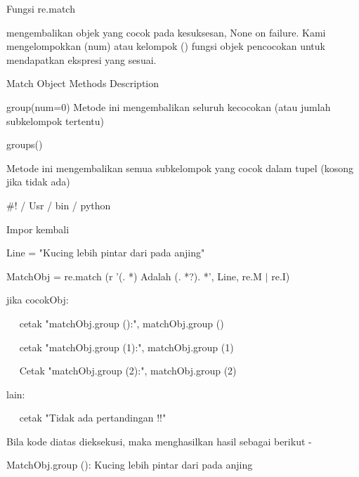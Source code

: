 \vspace{12pt}
\vspace{12pt}
\noindent 
Fungsi re.match  \par
\noindent 
mengembalikan objek yang cocok pada kesuksesan, None on failure. Kami mengelompokkan (num) atau kelompok () fungsi objek pencocokan untuk mendapatkan ekspresi yang sesuai. \par
\noindent 
Match Object Methods \hspace*{0.5in} Description \par
\noindent 
group(num=0) \hspace*{0.5in} Metode ini mengembalikan seluruh kecocokan (atau jumlah subkelompok tertentu) \par
\vspace{12pt}
groups() \hspace*{0.5in}  \par
\noindent 
Metode ini mengembalikan semua subkelompok yang cocok dalam tupel (kosong jika tidak ada) \par
\vspace{12pt}
\vspace{12pt}
\noindent 
 $  \#  $! / Usr / bin / python \par
\noindent 
Impor kembali \par
\vspace{12pt}
\noindent 
Line = "Kucing lebih pintar dari pada anjing" \par
\vspace{12pt}
\noindent 
MatchObj = re.match (r '(. *) Adalah (. *?). *', Line, re.M  $  \vert  $ re.I) \par
\vspace{12pt}
\noindent 
jika cocokObj: \par
\noindent 
~~ cetak "matchObj.group ():", matchObj.group () \par
\noindent 
~~ cetak "matchObj.group (1):", matchObj.group (1) \par
\noindent 
~~ Cetak "matchObj.group (2):", matchObj.group (2) \par
\noindent 
lain: \par
\noindent 
~~ cetak "Tidak ada pertandingan !!" \par
\vspace{12pt}
\noindent 
Bila kode diatas dieksekusi, maka menghasilkan hasil sebagai berikut - \par
\vspace{12pt}
\noindent 
MatchObj.group (): Kucing lebih pintar dari pada anjing \par
